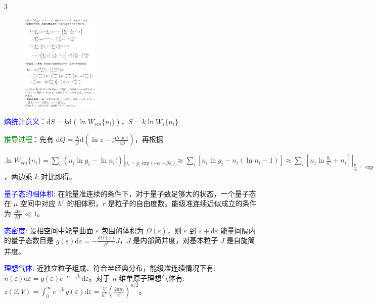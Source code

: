 \documentclass[a4paper,8pt]{extarticle} %
\newcommand{\bluetext}[1]{\textcolor{blue}{#1}}
\newcommand{\greentext}[1]{\textcolor{green}{#1}}
\begin{document}
\begin{multicols}{3}
\begin{figure}[H]
    \vspace{-0.3cm}
    \centering
    \includegraphics[width=0.33\textwidth]{images/2.png}
    \vspace{-0.6cm}
\end{figure}

\bluetext{熵统计意义}：$\mathrm{d}S = k\mathrm{d}(\ln W_{sm}\{n_i\})$，$S = k\ln W_s\{n_i\}$

\greentext{推导过程}：先有 $\overline{\mathrm{d}Q} = \frac{N}{\beta}\mathrm{d}(\ln z - \beta\frac{\partial\ln z}{\partial\beta})$，再根据 

$\ln W_{sm}\{n_i\} = \sum_i (n_i\ln g_i - \ln n_i!)|_{n_i=g_i\exp\{-\alpha-\beta\varepsilon_i\}} \approx \sum_i [n_i\ln g_i - n_i(\ln n_i-1)] \approx \sum_i [n_i\ln \frac{g_i}{n_i} + n_i]|_{\frac{g_i}{n_i}=\exp\{\alpha+\beta\varepsilon_i\}} = \sum_i n_i(\alpha + \beta\varepsilon_i + 1) = N\alpha + \beta E + N = N(\ln z - \beta\frac{\partial\ln z}{\partial\beta}) + N(1-\ln N)$，两边乘 $k$ 对比即得。

\bluetext{量子态的相体积}: 在能量准连续的条件下，对于量子数足够大的状态，一个量子态在 $\mu$ 空间中对应 $h^r$ 的相体积，$r$ 是粒子的自由度数。能级准连续近似成立的条件为 $\frac{\Delta \varepsilon_i}{kT} \ll 1$。

\bluetext{态密度}: 设相空间中能量曲面 $\varepsilon$ 包围的体积为 $\Omega(\varepsilon)$，则 $\varepsilon$ 到 $\varepsilon + \mathrm{d}\varepsilon$ 能量间隔内的量子态数目是 $g(\varepsilon)\mathrm{d}\varepsilon = -\frac{\mathrm{d}\Omega(\varepsilon)}{h^r}J$，$J$ 是内部简并度，对基本粒子 $J$ 是自旋简并度。

\bluetext{理想气体}: 近独立粒子组成、符合半经典分布，能级准连续情况下有: $n(\varepsilon)\mathrm{d}\varepsilon = g(\varepsilon)e^{-\alpha-\beta\varepsilon}\mathrm{d}\varepsilon$。对于 $n$ 维单原子理想气体有: $z(\beta,V) = \int_0^{\infty}e^{-\beta\varepsilon}g(\varepsilon)\mathrm{d}\varepsilon = \frac{V}{h^n}\left(\frac{2\pi m}{\beta}\right)^{n/2}$。


\end{multicols}
\end{document}
